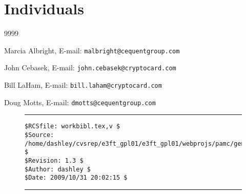 
\section*{Individuals}

\begin{thecustombibliography}{9999}

Marcia Albright,
E-mail: \texttt{malbright@cequentgroup.com}

John Cebasek,
E-mail: \texttt{john.cebasek@cryptocard.com}

Bill LaHam,
E-mail: \texttt{bill.laham@cryptocard.com}

Doug Motts,
E-mail: \texttt{dmotts@cequentgroup.com}

\end{thecustombibliography}


\noindent\begin{figure}[!b]
\noindent\rule[-0.25in]{\textwidth}{1pt}
\begin{tiny}
\begin{verbatim}
$RCSfile: workbibl.tex,v $
$Source: /home/dashley/cvsrep/e3ft_gpl01/e3ft_gpl01/webprojs/pamc/gen_a/docs/manual/man_a/comps/workbibl.tex,v $
$Revision: 1.3 $
$Author: dashley $
$Date: 2009/10/31 20:02:15 $
\end{verbatim}
\end{tiny}
\noindent\rule[0.25in]{\textwidth}{1pt}
\end{figure}

%
%
%
